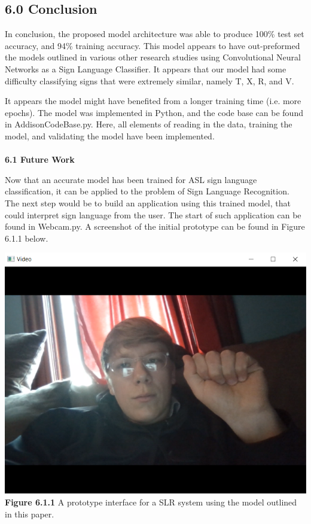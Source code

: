 \documentclass[11pt]{article}
\begin{document}
\begin{multicols}{2}
\subsection*{6.0 Conclusion}
In conclusion, the proposed model architecture was able to produce 100\% test set accuracy, and 94\% training accuracy.  This model appears to have out-preformed the models outlined in various other research studies using Convolutional Neural Networks as a Sign Language Classifier.  It appears that our model had some difficulty classifying signs that were extremely similar, namely T, X, R, and V.  
\par 
It appears the model might have benefited from a longer training time (i.e. more epochs).  The model was implemented in Python, and the code base can be found in AddisonCodeBase.py.  Here, all elements of reading in the data, training the model, and validating the model have been implemented. \\ \\
\textbf{6.1 Future Work}
\par
Now that an accurate model has been trained for ASL sign language classification, it can be applied to the problem of Sign Language Recognition.  The next step would be to build an application using this trained model, that could interpret sign language from the user.  The start of such application can be found in Webcam.py.  A screenshot of the initial prototype can be found in Figure 6.1.1 below.
\begin{center}
\includegraphics[scale=.5]{CameraApp}
\textbf{Figure 6.1.1} A prototype interface for a SLR system using the model outlined in this paper.
\end{center}


\end{multicols}
\end{document}

